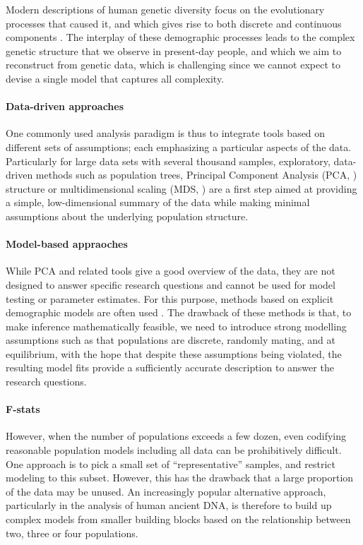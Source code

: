 \documentclass[12pt,fullpage, a4paper]{article}
\begin{document}
Modern descriptions of human genetic diversity focus on the evolutionary processes that caused it, and which gives rise to  both discrete and continuous components \citep{rosenberg2002a, serre2004, rosenberg2005, bradburd2018, reich2018a}.
The interplay of these demographic processes leads to the complex genetic structure that we observe in present-day people, and which we aim to reconstruct from genetic data, which is challenging since we cannot expect to devise a single model that captures all complexity. 

\paragraph{Data-driven approaches}
One commonly used analysis paradigm is thus to integrate tools based on different sets of assumptions; each emphasizing a particular aspects of the data. Particularly for large data sets with several thousand samples, exploratory, data-driven methods such as population trees, Principal Component Analysis (PCA, \cite{cavalli-sforza1994}) structure \citep{pritchard2000} or multidimensional scaling (MDS, \cite{malaspinas2014}) are a first step aimed at providing a simple, low-dimensional summary of the data while making minimal assumptions about the underlying population structure.

\paragraph{Model-based appraoches}
While PCA and related tools give a good overview of the data, they are not designed to answer specific research questions and cannot be used for model testing or parameter estimates. For this purpose, methods based on explicit demographic models  are often used \citep{gutenkunst2009, kamm2015, excoffier2013}. The drawback of these methods is that, to make inference mathematically feasible, we need to introduce strong modelling assumptions such as that populations are discrete, randomly mating, and at equilibrium, with the hope that despite these assumptions being violated, the resulting model fits provide a sufficiently accurate description to answer the research questions.

\paragraph{F-stats}
However, when the number of populations exceeds a few dozen,  even codifying reasonable population models including all data can be prohibitively difficult. One approach is to pick a small set of ``representative'' samples, and restrict modeling to this subset. However, this has the drawback that a large proportion of the data may be unused. An increasingly popular alternative approach, particularly in the analysis of human ancient DNA, is therefore to build up complex models from smaller building blocks based on the relationship between two, three or four populations.
\end{document}
